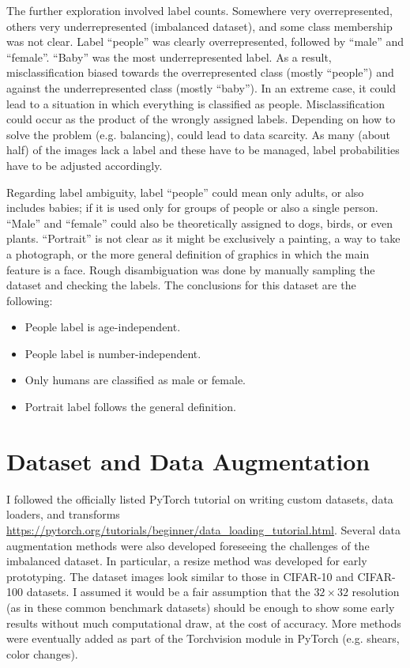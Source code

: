 \documentclass{article}
\begin{document}
The further exploration involved label counts.
Somewhere very overrepresented, others very underrepresented (imbalanced dataset), and some class membership was not clear.
Label ``people'' was clearly overrepresented, followed by ``male'' and ``female''.
``Baby'' was the most underrepresented label.
As a result, misclassification biased towards the overrepresented class (mostly ``people'') and against the underrepresented class (mostly ``baby'').
In an extreme case, it could lead to a situation in which everything is classified as people.
Misclassification could occur as the product of the wrongly assigned labels.
Depending on how to solve the problem (e.g. balancing), could lead to data scarcity.
As many (about half) of the images lack a label and these have to be managed, label probabilities have to be adjusted accordingly.

Regarding label ambiguity, label ``people'' could mean only adults, or also includes babies; if it is used only for groups of people or also a single person.
``Male'' and ``female'' could also be theoretically assigned to dogs, birds, or even plants.
``Portrait'' is not clear as it might be exclusively a painting, a way to take a photograph, or the more general definition of graphics in which the main feature is a face.
Rough disambiguation was done by manually sampling the dataset and checking the labels.
The conclusions for this dataset are the following:

\begin{itemize}
  \item People label is age-independent.
  \item People label is number-independent.
  \item Only humans are classified as male or female.
  \item Portrait label follows the general definition.
\end{itemize}


\section{Dataset and Data Augmentation}
I followed the officially listed PyTorch tutorial on writing custom datasets, data loaders, and transforms \url{https://pytorch.org/tutorials/beginner/data_loading_tutorial.html}.
Several data augmentation methods were also developed foreseeing the challenges of the imbalanced dataset.
In particular, a resize method was developed for early prototyping.
The dataset images look similar to those in CIFAR-10 and CIFAR-100 datasets.
I assumed it would be a fair assumption that the \(32 \times 32\) resolution (as in these common benchmark datasets) should be enough to show some early results without much computational draw, at the cost of accuracy.
More methods were eventually added as part of the Torchvision module in PyTorch (e.g. shears, color changes).
\end{document}
